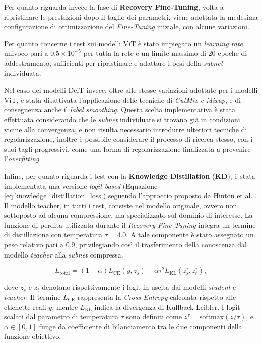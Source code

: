 Per quanto riguarda invece la fase di \textbf{Recovery Fine-Tuning}, volta a
ripristinare le prestazioni dopo il taglio dei parametri, viene adottata la
medesima configurazione di ottimizzazione del \textit{Fine-Tuning} iniziale,
con alcune variazioni. \par
Per quanto concerne i test sui modelli ViT è stato impiegato un
\textit{learning rate} univoco pari a $0.5 \times 10^{-5}$ per tutta la rete e
un limite massimo di 20 epoche di addestramento, sufficienti per ripristinare e
adattare i pesi della \textit{subnet} individuata. \par
Nel caso dei modelli DeiT invece, oltre alle stesse variazioni adottate per i
modelli ViT, è stata disattivata l'applicazione delle tecniche di
\textit{CutMix e Mixup}, e di conseguenza anche il \textit{label smoothing}.
Questa scelta implementativa è stata effettuata considerando che le
\textit{subnet} individuate si trovano già in condizioni vicine alla
convergenza, e non risulta necessario introdurre ulteriori tecniche di
regolarizzazione, inoltre è possibile considerare il processo di ricerca
stesso, con i suoi tagli progressivi, come una forma di regolarizzazione
finalizzata a prevenire l'\textit{overfitting}. \par
Infine, per quanto riguarda i test con la \textbf{Knowledge Distillation}
(\textbf{KD}), è stata implementata una versione \textit{logit-based} (Equazione \ref{eq:knowledge_distillation_loss}) seguendo
l'approccio proposto da Hinton et al. \cite{hinton2015distilling}. Il modello
teacher, in tutti i test, consiste nel modello originale, ovvero non sottoposto
ad alcuna compressione, ma specializzato sul dominio di interesse. La funzione di
perdita utilizzata durante il \textit{Recovery Fine-Tuning} integra un termine
di distillazione con temperatura $\tau = 4.0$. A tale componente è stato
assegnato un peso relativo pari a $0.9$, privilegiando così il trasferimento
della conoscenza dal modello \textit{teacher} alla \textit{subnet} compressa. 

\begin{equation}
    \label{eq:knowledge_distillation_loss}
    L_{\text{total}} = (1 - \alpha) L_{\text{CE}}(y, z_s) + \alpha \tau^2 L_{\text{KL}}\left( z_s^\tau, z_t^\tau \right),
\end{equation}

dove $z_s$ e $z_t$ denotano rispettivamente i logit in uscita dai modelli \textit{student} e \textit{teacher}. Il termine $L_{\text{CE}}$ rappresenta la \textit{Cross-Entropy} calcolata rispetto alle etichette reali $y$, mentre $L_{\text{KL}}$ indica la divergenza di Kullback-Leibler. I logit scalati dal parametro di temperatura $\tau$ sono definiti come $z^\tau = \text{softmax}(z / \tau)$, e $\alpha \in [0, 1]$ funge da coefficiente di bilanciamento tra le due componenti della funzione obiettivo. \par

